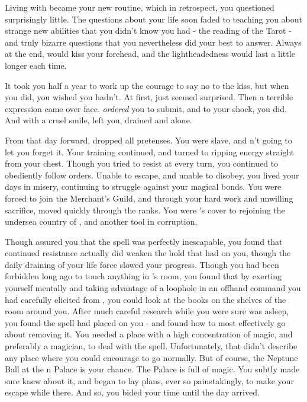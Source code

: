 \documentclass[char]{NeptuneBall}
\begin{document}
Living with \cWitch{\them} became your new routine, which in retrospect, you questioned surprisingly little. The questions about your life soon faded to \cWitch{\them} teaching you about strange new abilities that you didn't know you had - the reading of the Tarot - and truly bizarre questions that you nevertheless did your best to answer.  Always at the end, \cWitch{\they} would kiss your forehead, and the lightheadedness would last a little longer each time.

It took you half a year to work up the courage to say no to the kiss, but when you did, you wished you hadn't. At first, \cWitch{\they} just seemed surprised. Then a terrible expression came over \cWitch{\their} face. \cWitch{} \emph{ordered} you to submit, and to your shock, you did. And with a cruel smile, \cWitch{\they} left you, drained and alone.

From that day forward, \cWitch{} dropped all pretenses. You were \cWitch{\their} slave, and \cWitch{\they} \cWitch{\were}n't going to let you forget it. Your training continued, and \cWitch{\they} turned to ripping energy straight from your chest.  Though you tried to resist \cWitch{\them} at every turn, you continued to obediently follow orders. Unable to escape, and unable to disobey, you lived your days in misery, continuing to struggle against your magical bonds. You were forced to join the Merchant's Guild, and through your hard work and unwilling sacrifice, moved quickly through the ranks. You were \cWitch{}'s cover to rejoining the undersea country of \pAtlantis{}, and another tool in \cWitch{\their} corruption.

Though \cWitch{\they} assured you that the spell was perfectly inescapable, you found that continued resistance actually did weaken the hold that \cWitch{\they} had on you, though the daily draining of your life force slowed your progress. Though you had been forbidden long ago to touch anything in \cWitch{}'s room, you found that by exerting yourself mentally and taking advantage of a loophole in an offhand command you had carefully elicited from \cWitch{\them}, you could look at the books on the shelves of the room around you. After much careful research while you were sure \cWitch{} was asleep, you found the spell \cWitch{\they} had placed on you - and found how to most effectively go about removing it. You needed a place with a high concentration of magic, and preferably a magician, to deal with the spell. Unfortunately, that didn't describe any place where you could encourage \cWitch{} to go normally. But of course, the Neptune Ball at the \pAtlantis{}n Palace is your chance. The Palace is full of magic. You subtly made sure \cWitch{} knew about it, and began to lay plans, ever so painstakingly, to make your escape while there. And so, you bided your time until the day arrived.
\end{document}
